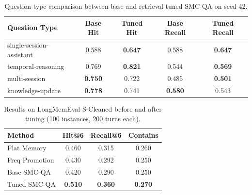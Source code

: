\documentclass{article}
\begin{document}
\begin{table}[H]
\centering
\caption{Question-type comparison between base and retrieval-tuned SMC-QA on seed 42.}
\label{tab:question-type}
\begin{tabular}{lcccc}
\toprule
\textbf{Question Type} & \textbf{Base Hit} & \textbf{Tuned Hit} & \textbf{Base Recall} & \textbf{Tuned Recall} \\
\midrule
single-session-assistant & 0.588 & \textbf{0.647} & 0.588 & \textbf{0.647} \\
temporal-reasoning & 0.769 & \textbf{0.821} & 0.544 & \textbf{0.569} \\
multi-session & \textbf{0.750} & 0.722 & 0.485 & \textbf{0.501} \\
knowledge-update & \textbf{0.778} & 0.741 & \textbf{0.580} & 0.543 \\
\bottomrule
\end{tabular}
\end{table}

\begin{table}[H]
\centering
\caption{Results on LongMemEval S-Cleaned before and after tuning (100 instances, 200 turns each).}
\label{tab:scleaned}
\begin{tabular}{lccc}
\toprule
\textbf{Method} & \textbf{Hit@6} & \textbf{Recall@6} & \textbf{Contains} \\
\midrule
Flat Memory & 0.460 & 0.315 & 0.260 \\
Freq Promotion & 0.430 & 0.292 & 0.250 \\
Base SMC-QA & 0.420 & 0.290 & 0.250 \\
Tuned SMC-QA & \textbf{0.510} & \textbf{0.360} & \textbf{0.270} \\
\bottomrule
\end{tabular}
\end{table}
\end{document}
